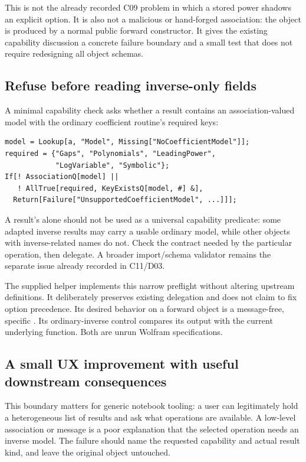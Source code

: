 \documentclass[11pt,letterpaper]{article}
\theoremstyle{definition}\newtheorem{definition}[proposition]{Definition}
\begin{document}
This is not the already recorded C09 problem in which a stored power shadows
an explicit option. It is also not a malicious or hand-forged association:
the object is produced by a normal public forward constructor. It gives the
existing capability discussion a concrete failure boundary and a small test
that does not require redesigning all object schemas.\cite{review6,register}

\subsection{Refuse before reading inverse-only fields}
A minimal capability check asks whether a result contains an association-valued
model with the ordinary coefficient routine's required keys:
\begin{lstlisting}
model = Lookup[a, "Model", Missing["NoCoefficientModel"]];
required = {"Gaps", "Polynomials", "LeadingPower",
            "LogVariable", "Symbolic"};
If[! AssociationQ[model] ||
   ! AllTrue[required, KeyExistsQ[model, #] &],
  Return[Failure["UnsupportedCoefficientModel", ...]]];
\end{lstlisting}
A result's  alone should not be used as a universal capability
predicate: some adapted inverse results may carry a usable ordinary model,
while other objects with inverse-related names do not. Check the contract
needed by the particular operation, then delegate. A broader import/schema
validator remains the separate issue already recorded in C11/D03.

The supplied  helper implements this narrow
preflight without altering upstream definitions. It deliberately preserves
existing delegation and does not claim to fix option precedence. Its desired
behavior on a forward object is a message-free, specific . Its
ordinary-inverse control compares its output with the current underlying
function. Both are unrun Wolfram specifications.

\subsection{A small UX improvement with useful downstream consequences}
This boundary matters for generic notebook tooling: a user can legitimately
hold a heterogeneous list of  results and ask what
operations are available. A low-level association or  message is a
poor explanation that the selected operation needs an inverse model. The
failure should name the requested capability and actual result kind, and
leave the original object untouched.
\end{document}
